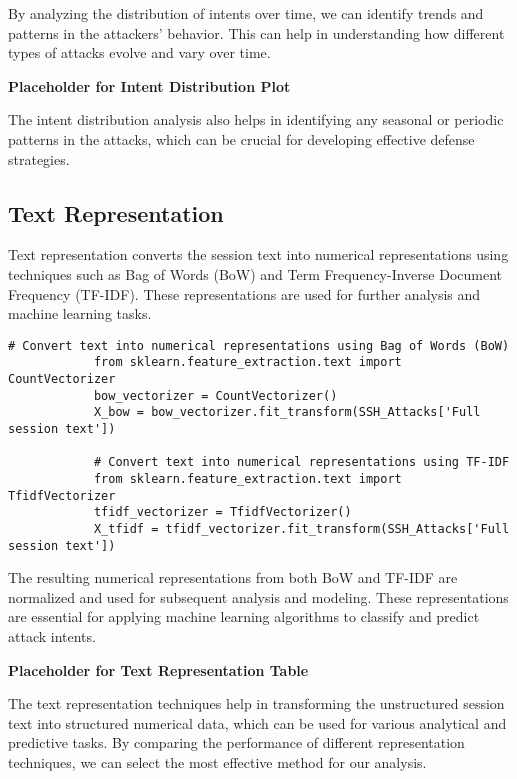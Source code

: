         By analyzing the distribution of intents over time, we can identify trends and patterns in the attackers' behavior. This can help in understanding how different types of attacks evolve and vary over time.

        \textbf{Placeholder for Intent Distribution Plot}

        The intent distribution analysis also helps in identifying any seasonal or periodic patterns in the attacks, which can be crucial for developing effective defense strategies.

    \subsection{Text Representation}
    
        Text representation converts the session text into numerical representations using techniques such as Bag of Words (BoW) and Term Frequency-Inverse Document Frequency (TF-IDF). These representations are used for further analysis and machine learning tasks.
        
        \vspace{0.5em}

        \begin{lstlisting}[caption={Convert text into numerical representations}, label={lst:convert-text-numerical}]
            # Convert text into numerical representations using Bag of Words (BoW)
            from sklearn.feature_extraction.text import CountVectorizer
            bow_vectorizer = CountVectorizer()
            X_bow = bow_vectorizer.fit_transform(SSH_Attacks['Full session text'])

            # Convert text into numerical representations using TF-IDF
            from sklearn.feature_extraction.text import TfidfVectorizer
            tfidf_vectorizer = TfidfVectorizer()
            X_tfidf = tfidf_vectorizer.fit_transform(SSH_Attacks['Full session text'])
        \end{lstlisting}

        The resulting numerical representations from both BoW and TF-IDF are normalized and used for subsequent analysis and modeling. These representations are essential for applying machine learning algorithms to classify and predict attack intents.

        \textbf{Placeholder for Text Representation Table}

        The text representation techniques help in transforming the unstructured session text into structured numerical data, which can be used for various analytical and predictive tasks. By comparing the performance of different representation techniques, we can select the most effective method for our analysis.
